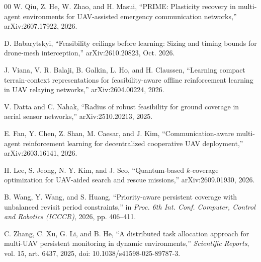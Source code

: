 \documentclass[conference]{IEEEtran}
\begin{document}
\begin{thebibliography}{00}
W. Qiu, Z. He, W. Zhao, and H. Masui, ``PRIME: Plasticity recovery in multi-agent environments for UAV-assisted emergency communication networks,'' arXiv:2607.17922, 2026.

D. Babarytskyi, ``Feasibility ceilings before learning: Sizing and timing bounds for drone-mesh interception,'' arXiv:2610.20823, Oct. 2026.

J. Viana, V. R. Balaji, B. Galkin, L. Ho, and H. Claussen, ``Learning compact terrain-context representations for feasibility-aware offline reinforcement learning in UAV relaying networks,'' arXiv:2604.00224, 2026.

V. Datta and C. Nahak, ``Radius of robust feasibility for ground coverage in aerial sensor networks,'' arXiv:2510.20213, 2025.

E. Fan, Y. Chen, Z. Shan, M. Caesar, and J. Kim, ``Communication-aware multi-agent reinforcement learning for decentralized cooperative UAV deployment,'' arXiv:2603.16141, 2026.

H. Lee, S. Jeong, N. Y. Kim, and J. Seo, ``Quantum-based $k$-coverage optimization for UAV-aided search and rescue missions,'' arXiv:2609.01930, 2026.

B. Wang, Y. Wang, and S. Huang, ``Priority-aware persistent coverage with unbalanced revisit period constraints,'' in \emph{Proc. 6th Int. Conf. Computer, Control and Robotics (ICCCR)}, 2026, pp. 406--411.

C. Zhang, C. Xu, G. Li, and B. He, ``A distributed task allocation approach for multi-UAV persistent monitoring in dynamic environments,'' \emph{Scientific Reports}, vol. 15, art. 6437, 2025, doi: 10.1038/s41598-025-89787-3.

\end{thebibliography}
\end{document}
